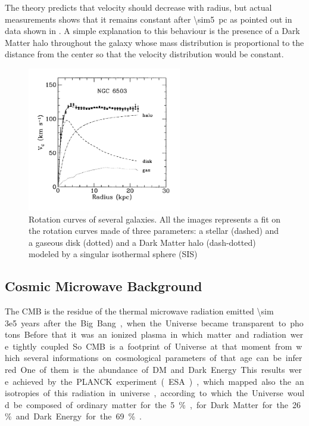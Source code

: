 The theory predicts that velocity should decrease with radius, but actual measurements shows that it remains constant after \SI{\sim5}{pc} as pointed out in data shown in \Fig{\ref{fig:rotation}}. A simple explanation to this behaviour is the presence of a Dark Matter halo throughout the galaxy whose mass distribution is proportional to the distance from the center so that the velocity distribution would be constant.
\begin{figure}[pt]
\centering
\includegraphics[width=0.6\textwidth]{DarkMatter/Rotationcurves}
\caption{Rotation curves of several galaxies. All the images represents a fit on the rotation curves made of three parameters: a stellar (dashed) and a gaseous disk (dotted) and a Dark Matter halo (dash-dotted) modeled by a singular isothermal sphere (SIS)}
\label{fig:rotation}
\end{figure}


\subsection{Cosmic Microwave Background}
The CMB is the residue of the thermal microwave radiation emitted \SI{\sim 3e5} years after the Big Bang, when the Universe became transparent to photons. Before that it was an ionized plasma in which matter and radiation were tightly coupled. So CMB is a footprint of Universe at that moment from which several informations on cosmological parameters of that age can be inferred. One of them is the abundance of DM and Dark Energy. This results were achieved by the PLANCK experiment (ESA), which mapped also the anisotropies of this radiation in universe, according to which the Universe would be composed of ordinary matter for the 5\%, for Dark Matter for the 26\% and Dark Energy for the 69\% \cite{Planck:results}.

